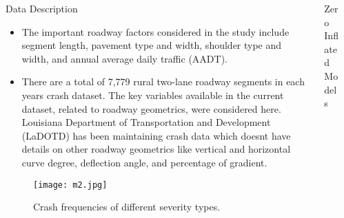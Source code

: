 \documentclass[final]{beamer}
\newlength{\sepwid}
\newlength{\onecolwid}
\newlength{\twocolwid}
\begin{document}
\begin{frame}[t]
\begin{columns}[t]
   \begin{column}{\sepwid}\end{column}			%
    \begin{column}{\twocolwid}							%
      \begin{columns}[t,totalwidth=\twocolwid]	%

        \begin{column}{\onecolwid}\vspace{-.69in}
          \begin{block}{Data Description}
             {}
             \begin{itemize}
              \item The important roadway factors considered in the study include segment length, pavement type and width, shoulder type and width, and annual average daily traffic (AADT).
              \item There are a total of 7,779 rural two-lane roadway segments in each year\textquotesingle s crash dataset. The key variables available in the current dataset, related to roadway geometrics, were considered here. Louisiana Department of Transportation and Development (LaDOTD) has been maintaining crash data which doesn\textquotesingle t have details on other roadway geometrics like vertical and horizontal curve degree, deflection angle, and percentage of gradient.
            \end{itemize}
            \vspace{0.25in}
            \begin{figure}
              \begin{center}
                \texttt{[image: m2.jpg]}
                \caption{Crash frequencies of different severity types.}
                \label{fig:multDom}
              \end{center}
            \end{figure}
          \end{block}
        \end{column}
        \begin{column}{\onecolwid}\vspace{-.69in}
                  \begin{block}{Zero Inflated Models}
            {}\\
            \vspace{0.25in}


\end{block}
\end{column}
\end{columns}
\end{column}
\end{columns}
\end{frame}
\end{document}
